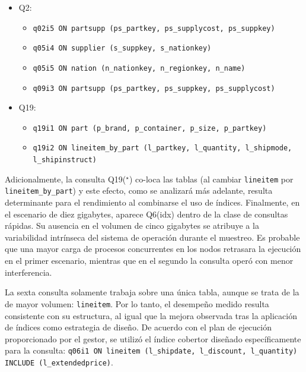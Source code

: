 \documentclass[12pt, letter paper]{report}
\begin{document}
        \begin{itemize}
          \item Q2:
          \begin{itemize}
            \item \texttt{q02i5 ON partsupp (ps\_partkey, ps\_supplycost,
                                                                  ps\_suppkey)}
            \item \texttt{q05i4 ON supplier (s\_suppkey, s\_nationkey)}
            \item \texttt{q05i5 ON nation (n\_nationkey, n\_regionkey, n\_name)}
            \item \texttt{q09i3 ON partsupp (ps\_partkey, ps\_suppkey,
                                                                ps\_supplycost)}
          \end{itemize}
          \item Q19:
          \begin{itemize}
            \item \texttt{q19i1 ON part (p\_brand, p\_container, p\_size,
                                                                    p\_partkey)}
            \item \texttt{q19i2 ON lineitem\_by\_part (l\_partkey, l\_quantity,
                                                  l\_shipmode, l\_shipinstruct)}
          \end{itemize}
        \end{itemize}

        Adicionalmente, la consulta Q19($^\star$) co-loca las tablas (al cambiar
        \texttt{lineitem} por \texttt{lineitem\_by\_part}) y este efecto, como
        se analizará más adelante, resulta determinante para el rendimiento al
        combinarse el uso de índices. Finalmente, en el escenario de diez
        gigabytes, aparece Q6(idx) dentro de la clase de consultas rápidas.
        Su ausencia en el volumen de cinco gigabytes se atribuye a la
        variabilidad intrínseca del sistema de operación durante el muestreo. Es
        probable que una mayor carga de procesos concurrentes en los nodos
        retrasara la ejecución en el primer escenario, mientras que en el
        segundo la consulta operó con menor interferencia.

        La sexta consulta solamente trabaja sobre una única tabla, aunque se
        trata de la de mayor volumen: \texttt{lineitem}. Por lo tanto, el
        desempeño medido resulta consistente con su estructura, al igual que la
        mejora observada tras la aplicación de índices como estrategia de
        diseño. De acuerdo con el plan de ejecución proporcionado por el gestor,
        se utilizó el índice cobertor diseñado específicamente para la consulta:
        \texttt{q06i1 ON lineitem (l\_shipdate, l\_discount, l\_quantity)
        INCLUDE (l\_extendedprice)}.
\end{document}
